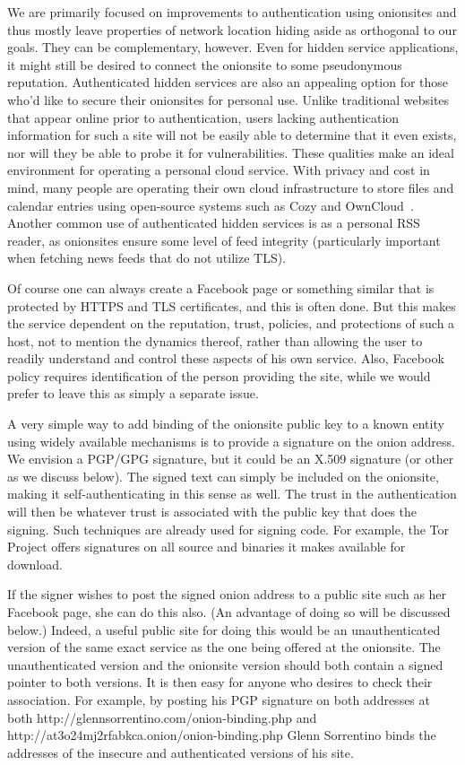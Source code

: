 \documentclass[10pt, conference, compsocconf]{styles/IEEEtran}
\begin{document}
We are primarily focused on improvements to authentication using
onionsites and thus mostly leave properties of network location hiding
aside as orthogonal to our goals. They can be complementary, however.
Even for hidden service applications, it might still be desired to
connect the onionsite to some pseudonymous reputation.  Authenticated
hidden services are also an appealing option for those who'd like to
secure their onionsites for personal use.  Unlike traditional websites
that appear online prior to authentication, users lacking
authentication information for such a site will not be easily able to
determine that it even exists, nor will they be able to probe it for
vulnerabilities.  These qualities make an ideal environment for
operating a personal cloud service.  With privacy and cost in mind,
many people are operating their own cloud infrastructure to store
files and calendar entries using open-source systems such as Cozy and
OwnCloud~\cite{cozy}.  Another common use of authenticated hidden
services is as a personal RSS reader, as onionsites ensure some level
of feed integrity (particularly important when fetching news feeds
that do not utilize TLS).

Of course one can always create a Facebook page or something similar
that is protected by HTTPS and TLS certificates,
and this is often done.  But this makes the service dependent on the
reputation, trust, policies, and protections of such a host, not to mention
the dynamics thereof, rather than allowing the user to readily understand
and control these aspects of his own service. Also, Facebook
policy requires identification of the person providing the site,
while we would prefer to leave this as simply a separate issue.

A very simple way to add binding of the onionsite public key to
a known entity using widely available mechanisms is to provide a
signature on the onion address. We envision a PGP/GPG signature, but
it could be an X.509 signature (or other as we discuss below). 
The signed text can simply be
included on the onionsite, making it self-authenticating in this sense
as well. The trust in the authentication will then be whatever trust
is associated with the public key that does the signing. Such
techniques are already used for signing code. For example,
the Tor Project offers signatures on all source and binaries
it makes available for download. 

If the signer wishes to post the signed onion address to a public site
such as her Facebook page, she can do this also. (An advantage of
doing so will be discussed below.) Indeed, a useful public site for
doing this would be an unauthenticated version of the same exact
service as the one being offered at the onionsite.  The
unauthenticated version and the onionsite version should both contain
a signed pointer to both versions. It is then easy for anyone who
desires to check their association.  For example, by posting his PGP
signature on both addresses at both
http://glennsorrentino.com/onion-binding.php and
http://at3o24mj2rfabkca.onion/onion-binding.php Glenn Sorrentino binds
the addresses of the insecure and authenticated versions of his site.
\end{document}
